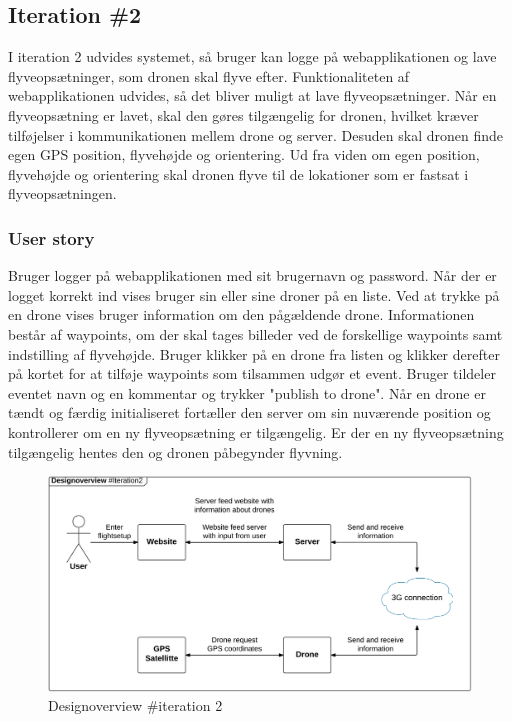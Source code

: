 \subsection{Iteration \#2}
I iteration 2 udvides systemet, så bruger kan logge på webapplikationen og lave flyveopsætninger, som dronen skal flyve efter. Funktionaliteten af webapplikationen udvides, så det bliver muligt at lave flyveopsætninger. Når en flyveopsætning er lavet, skal den gøres tilgængelig for dronen, hvilket kræver tilføjelser i kommunikationen mellem drone og server. 
Desuden skal dronen finde egen GPS position, flyvehøjde og orientering. Ud fra viden om egen position, flyvehøjde og orientering skal dronen flyve til de lokationer som er fastsat i flyveopsætningen. 


\subsubsection*{User story}
Bruger logger på webapplikationen med sit brugernavn og password. Når der er logget korrekt ind vises bruger sin eller sine droner på en liste. Ved at trykke på en drone vises bruger information om den pågældende drone. Informationen består af waypoints, om der skal tages billeder ved de forskellige waypoints samt indstilling af flyvehøjde. Bruger klikker på en drone fra listen og klikker derefter på kortet for at tilføje waypoints som tilsammen udgør et event. Bruger tildeler eventet navn og en kommentar og trykker "publish to drone".
Når en drone er tændt og færdig initialiseret fortæller den server om sin nuværende position og kontrollerer om en ny flyveopsætning er tilgængelig. Er der en ny flyveopsætning tilgængelig hentes den og dronen påbegynder flyvning.

\begin{figure}[H]
	\centering
	\includegraphics[width=1\textwidth]{Billeder/design_overview/design_overview_iteration2.png}
	\vspace{-.5cm}
	\caption{Designoverview \#iteration 2}
	\label{fig:design_overview_UC1}
\end{figure}


